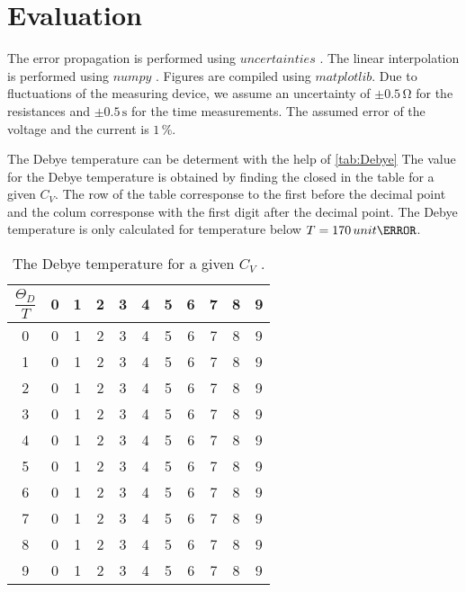 \section{Evaluation}
\label{sec:Auswertung}



The error propagation is performed using $uncertainties$ \cite{unp}. The linear interpolation is performed using $numpy$ \cite{numpy}.
Figures are compiled using $matplotlib$\cite{Hunter:2007}. Due to fluctuations of the measuring device, we assume an uncertainty of
$\pm 0.5 \, \unit{\ohm}$ for the resistances and $\pm 0.5 \, \unit{\second} $ for the time measurements. 
The assumed error of the voltage and the current is $1 \, \%$.



The Debye temperature can be determent with the help of \autoref{tab:Debye}
The value for the Debye temperature is obtained by finding the closed in the table for a given $C_V$.
The row of the table corresponse  to the first before the decimal point and the colum corresponse
with the first digit after the decimal point. 
The Debye temperature is only calculated for temperature below $T = 170 \, unit{\kelvin}$.

\begin{table}[H]
\centering
\caption{The Debye temperature for a given $C_V$  \cite{v47}.}
\label{tab:Debye}
\begin{tabular}{c | c c c c c c c c c c}
\toprule
 $\dfrac{\Theta_D}{T} $ &0 & 1 & 2 &3 & 4 & 5&6 & 7 & 8 &9\\
\midrule
    0 & 0 & 1 & 2 & 3 & 4 & 5 & 6 & 7 & 8 & 9 \\
    1 & 0 & 1 & 2 & 3 & 4 & 5 & 6 & 7 & 8 & 9 \\
    2 & 0 & 1 & 2 & 3 & 4 & 5 & 6 & 7 & 8 & 9 \\
    3 & 0 & 1 & 2 & 3 & 4 & 5 & 6 & 7 & 8 & 9 \\
    4 & 0 & 1 & 2 & 3 & 4 & 5 & 6 & 7 & 8 & 9 \\
    5 & 0 & 1 & 2 & 3 & 4 & 5 & 6 & 7 & 8 & 9 \\
    6 & 0 & 1 & 2 & 3 & 4 & 5 & 6 & 7 & 8 & 9 \\
    7 & 0 & 1 & 2 & 3 & 4 & 5 & 6 & 7 & 8 & 9 \\
    8 & 0 & 1 & 2 & 3 & 4 & 5 & 6 & 7 & 8 & 9 \\
    9 & 0 & 1 & 2 & 3 & 4 & 5 & 6 & 7 & 8 & 9 \\
\bottomrule
\end{tabular}
\end{table}